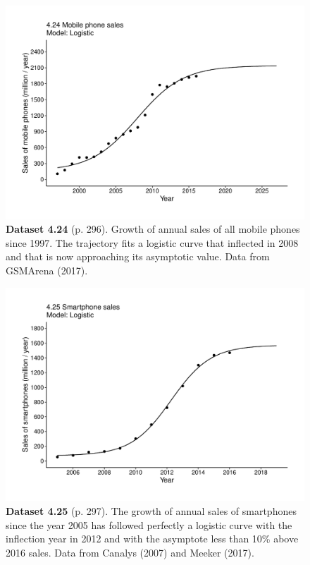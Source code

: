 \documentclass[aps,rmp,preprint,superscriptaddress,10pt,onecolumn]{article}
\begin{document}
\clearpage
\begin{figure}[h]
\includegraphics[width=\textwidth]{output/figs-ggplot/4.24.pdf}
\caption*{\textbf{Dataset 4.24} (p. 296). Growth of annual sales of all mobile phones since 1997. The trajectory fits a logistic curve that inflected in 2008 and that is now approaching its asymptotic value. Data from GSMArena (2017).}
\end{figure}
	
\clearpage
\begin{figure}[h]
\includegraphics[width=\textwidth]{output/figs-ggplot/4.25.pdf}
\caption*{\textbf{Dataset 4.25} (p. 297). The growth of annual sales of smartphones since the year 2005 has followed perfectly a logistic curve with the inflection year in 2012 and with the asymptote less than 10\% above 2016 sales. Data from Canalys (2007) and Meeker (2017).}
\end{figure}
	
\end{document}
